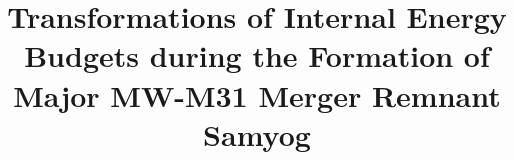 \documentclass[twocolumn]{aastex631}
\begin{document}
\title{Transformations of Internal Energy Budgets during the Formation of Major MW-M31 Merger Remnant Samyog}


\end{document}
